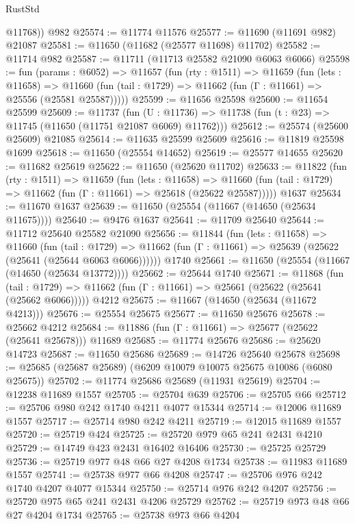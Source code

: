 \begin{lexlean}{RustStd}
\begin{coremodule}
        @11768))
    @982
@25574 := @11774 @11576
@25577 := @11690 (@11691 @982) @21087
@25581 := @11650 (@11682 (@25577 @11698) @11702)
@25582 := @11714 @982
@25587 := @11711 (@11713 @25582 @21090 @6063 @6066)
@25598 := fun (params : @6052) =>
  @11657
    (fun (rty : @1511) =>
    @11659
      (fun (lets : @11658) =>
      @11660 (fun (tail : @1729) => @11662 (fun (Γ : @11661) => @25556 (@25581 @25587)))))
@25599 := @11656 @25598
@25600 := @11654 @25599
@25609 := @11737
    (fun (U : @11736) => @11738 (fun (t : @23) => @11745 (@11650 (@11751 @21087 @6069) @11762)))
@25612 := @25574 (@25600 @25609) @21085
@25614 := @11635 @25599 @25609
@25616 := @11819 @25598 @1699
@25618 := @11650 (@25554 @14652)
@25619 := @25577 @14655
@25620 := @11682 @25619
@25622 := @11650 (@25620 @11702)
@25633 := @11822
    (fun (rty : @1511) =>
    @11659
      (fun (lets : @11658) =>
      @11660 (fun (tail : @1729) => @11662 (fun (Γ : @11661) => @25618 (@25622 @25587)))))
    @1637
@25634 := @11670 @1637
@25639 := @11650 (@25554 (@11667 (@14650 (@25634 @11675))))
@25640 := @9476 @1637
@25641 := @11709 @25640
@25644 := @11712 @25640 @25582 @21090
@25656 := @11844
    (fun (lets : @11658) =>
    @11660
      (fun (tail : @1729) =>
      @11662 (fun (Γ : @11661) => @25639 (@25622 (@25641 (@25644 @6063 @6066))))))
    @1740
@25661 := @11650 (@25554 (@11667 (@14650 (@25634 @13772))))
@25662 := @25644 @1740
@25671 := @11868
    (fun (tail : @1729) => @11662 (fun (Γ : @11661) => @25661 (@25622 (@25641 (@25662 @6066)))))
    @4212
@25675 := @11667 (@14650 (@25634 (@11672 @4213)))
@25676 := @25554 @25675
@25677 := @11650 @25676
@25678 := @25662 @4212
@25684 := @11886 (fun (Γ : @11661) => @25677 (@25622 (@25641 @25678))) @11689
@25685 := @11774 @25676
@25686 := @25620 @14723
@25687 := @11650 @25686
@25689 := @14726 @25640 @25678
@25698 := @25685 (@25687 @25689) (@6209 @10079 @10075 @25675 @10086 (@6080 @25675))
@25702 := @11774 @25686 @25689 (@11931 @25619)
@25704 := @12238 @11689 @1557
@25705 := @25704 @639
@25706 := @25705 @66
@25712 := @25706 @980 @242 @1740 @4211 @4077 @15344
@25714 := @12006 @11689 @1557
@25717 := @25714 @980 @242 @4211
@25719 := @12015 @11689 @1557
@25720 := @25719 @424
@25725 := @25720 @979 @65 @241 @2431 @4210
@25729 := @14749 @423 @2431 @16402 @16406
@25730 := @25725 @25729
@25736 := @25719 @977 @48 @66 @27 @4208 @1734
@25738 := @11983 @11689 @1557
@25741 := @25738 @977 @66 @4208
@25747 := @25706 @976 @242 @1740 @4207 @4077 @15344
@25750 := @25714 @976 @242 @4207
@25756 := @25720 @975 @65 @241 @2431 @4206 @25729
@25762 := @25719 @973 @48 @66 @27 @4204 @1734
@25765 := @25738 @973 @66 @4204

\end{coremodule}
\end{lexlean}
